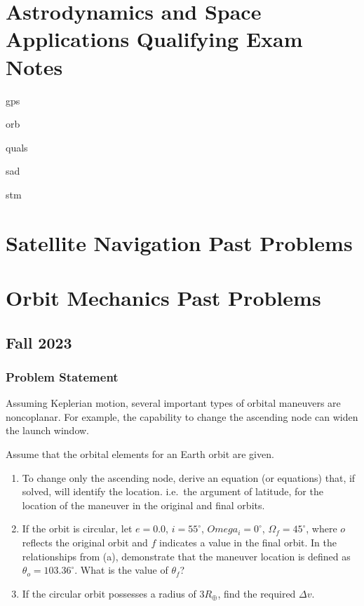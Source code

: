 \documentclass[
]{article}
\author{}
\date{}
\let\oldsection\section
\renewcommand\section{\clearpage\oldsection}
\providecommand{\tightlist}{%
  \setlength{\itemsep}{0pt}\setlength{\parskip}{0pt}}
\begin{document}
\section{Astrodynamics and Space Applications Qualifying Exam
Notes}\label{astrodynamics-and-space-applications-qualifying-exam-notes}

gps

orb

quals

sad

stm

\section{Satellite Navigation Past
Problems}\label{satellite-navigation-past-problems}

\section{Orbit Mechanics Past
Problems}\label{orbit-mechanics-past-problems}

\subsection{Fall 2023}\label{fall-2023}

\subsubsection{Problem Statement}\label{problem-statement}

Assuming Keplerian motion, several important types of orbital maneuvers
are noncoplanar. For example, the capability to change the ascending
node can widen the launch window.

Assume that the orbital elements for an Earth orbit are given.

\begin{enumerate}
\tightlist
\item
  To change only the ascending node, derive an equation (or equations)
  that, if solved, will identify the location. i.e.~the argument of
  latitude, for the location of the maneuver in the original and final
  orbits.
\item
  If the orbit is circular, let \(e=0.0\), \(i=55^\circ\),
  \(Omega_i=0^\circ\), \(\Omega_f=45^\circ\), where \(o\) reflects the
  original orbit and \(f\) indicates a value in the final orbit. In the
  relationships from (a), demonstrate that the maneuver location is
  defined as \(\theta_o = 103.36^\circ\). What is the value of
  \(\theta_f\)?
\item
  If the circular orbit possesses a radius of \(3R_\oplus\), find the
  required \(\Delta v\).
\end{enumerate}
\end{document}
